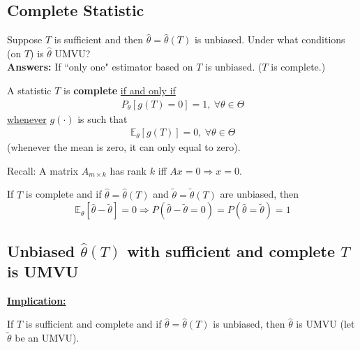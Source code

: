 \documentclass[11pt]{elegantbook}
\begin{document}
\subsection{Complete Statistic}
Suppose $T$ is sufficient and then $\hat{\theta}=\hat{\theta}(T)$ is unbiased. Under what conditions (on $T$) is $\hat{\theta}$ UMVU?\\
\textbf{Answers:} If ``only one" estimator based on $T$ is unbiased. ($T$ is complete.)

\begin{definition}
    \normalfont
    A statistic $T$ is \textbf{complete} \underline{if and only if}
    \begin{equation}
        \begin{aligned}
            P_\theta[g(T)=0]=1, \ \forall \theta\in \Theta
        \end{aligned}
        \nonumber
    \end{equation}
    \underline{whenever} $g(\cdot)$ is such that
    \begin{equation}
        \begin{aligned}
            \mathbb{E}_\theta[g(T)]=0,\ \forall \theta\in \Theta
        \end{aligned}
        \nonumber
    \end{equation}
    (whenever the mean is zero, it can only equal to zero).
\end{definition}

Recall: A matrix $A_{m\times k}$ has rank $k$ iff $Ax=0 \Rightarrow x=0$.

\begin{theorem}
    If $T$ is complete and if $\hat{\theta}=\hat{\theta}(T)$ and $\tilde{\theta}=\tilde{\theta}(T)$ are unbiased, then $$\mathbb{E}_\theta[\hat{\theta}-\tilde{\theta}]=0 \Rightarrow P(\hat{\theta}-\tilde{\theta}=0)=P(\hat{\theta}=\tilde{\theta})=1$$
\end{theorem}

\subsection{Unbiased $\hat{\theta}(T)$ with sufficient and complete $T$ is UMVU}
\textbf{\underline{Implication:}}
\begin{corollary}
    If $T$ is sufficient and complete and if $\hat{\theta}=\hat{\theta}(T)$ is unbiased, then $\hat{\theta}$ is UMVU (let $\tilde{\theta}$ be an UMVU).
\end{corollary}
\end{document}

